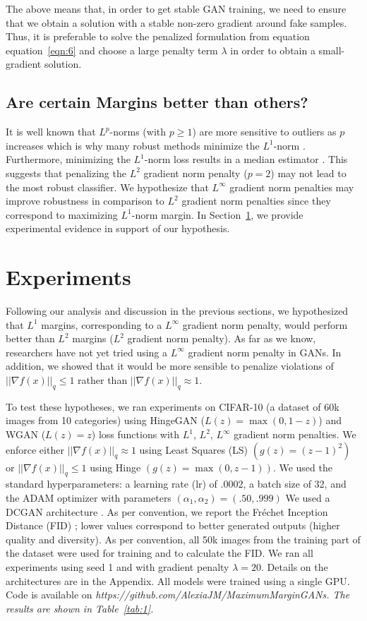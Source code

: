 \documentclass{article}
\def\eqref#1{equation~\ref{#1}}
\begin{document}
The above means that, in order to get stable GAN training, we need to ensure that we obtain a solution with a stable non-zero gradient around fake samples. Thus, it is preferable to solve the penalized formulation from equation \eqref{eqn:6} and choose a large penalty term $\lambda$ in order to obtain a small-gradient solution. 

\subsection{Are certain Margins better than others?}
\label{sec:5.4}

It is well known that $L^p$-norms (with $p\ge 1$) are more sensitive to outliers as $p$ increases which is why many robust methods minimize the $L^1$-norm \citep{bloomfield1983least}. Furthermore, minimizing the $L^1$-norm loss results in a median estimator \citep{bloomfield1983least}. This suggests that  penalizing the $L^2$ gradient norm penalty ($p=2$) may not lead to the most robust classifier. We hypothesize that $L^\infty$ gradient norm penalties may improve robustness in comparison to $L^2$ gradient norm penalties since they correspond to maximizing $L^1$-norm margin.
In Section~\ref{sec:6}, we provide experimental evidence in support of our hypothesis. 


\section{Experiments}
\label{sec:6}

Following our analysis and discussion in the previous sections, we hypothesized that $L^1$ margins, corresponding to a $L^\infty$ gradient norm penalty, would perform better than $L^2$ margins ($L^2$ gradient norm penalty).
As far as we know, researchers have not yet tried using a $L^\infty$ gradient norm penalty in GANs.
In addition, we showed that it would be more sensible to penalize violations of $||\nabla f(x)||_q \leq 1$ rather than $||\nabla f(x)||_q \approx 1$.

To test these hypotheses, we ran experiments on CIFAR-10 (a dataset of 60k images from 10 categories) \citep{krizhevsky2009learning} using HingeGAN ($L(z)=\max(0,1-z)$) and WGAN ($L(z)=z$) loss functions with $L^1$, $L^2$, $L^\infty$ gradient norm penalties. We enforce either $||\nabla f(x)||_q \approx 1$ using Least Squares (LS) $(g(z)=(z-1)^2)$ or $||\nabla f(x)||_q \leq 1$ using Hinge $(g(z)=\max(0,z-1))$. We used the standard hyperparameters: a learning rate (lr) of .0002, a batch size of 32, and the ADAM optimizer \citep{Adam} with parameters $(\alpha_1, \alpha_2)= (.50, .999)$ We used a DCGAN architecture \citep{DCGAN}. As per convention, we report the Fréchet Inception Distance (FID) \citep{heusel2017gans}; lower values correspond to better generated outputs (higher quality and diversity). As per convention, all 50k images from the training part of the dataset were used for training and to calculate the FID. We ran all experiments using seed 1 and with gradient penalty $\lambda=20$. Details on the architectures are in the Appendix. All models were trained using a single GPU. Code is available on \em https://github.com/AlexiaJM/MaximumMarginGANs\em. The results are shown in Table~\ref{tab:1}.
\end{document}
